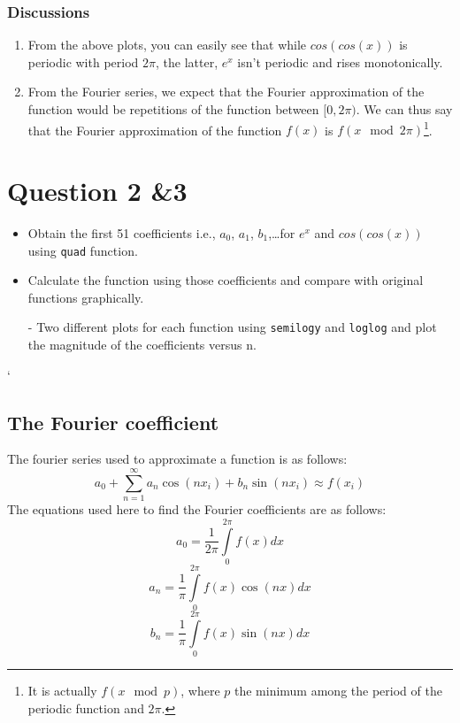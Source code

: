 \documentclass[11pt, a4paper, twoside]{article}
\begin{document}
            \subsubsection{Discussions}
                \begin{enumerate}
                    \item From the above plots, you can easily see that while $cos(cos(x))$ is periodic with period $2\pi$, the latter, $e^x$ isn't periodic and rises monotonically.
                    \item From the Fourier series, we expect that the Fourier approximation of the function would be repetitions of the function between $[0, 2\pi)$. We can thus say that the Fourier approximation of the function $f(x)$ is $f(x\mod2\pi)$\footnote{It is actually $f(x\mod p)$, where $p$ the minimum among the period of the periodic function and $2\pi$.}.
                \end{enumerate}
 
        \section{Question 2 \&3}
            \begin{itemize}[label=-]
                \item Obtain the first 51 coefficients i.e., $a_0$, $a_1$, $b_1$,\ldots for $e^x$ and $cos(cos(x))$ using \texttt{quad} function.
                \item Calculate the function using those coefficients and compare with original functions graphically.
                \item[-] Two  different  plots  for  each  function  using  \texttt{semilogy}  and  \texttt{loglog} and plot the magnitude of the coefficients versus n.
            \end{itemize}
 
`

\subsection{The Fourier coefficient}
The fourier series used to approximate a function is as follows:
\begin{equation}
    a_{0} + \sum\limits_{n=1}^{\infty} {{a_{n}\cos(nx_{i})+b_{n}\sin(nx_{i})}} \approx f(x_{i}) 
    \end{equation}
    	The equations used here to find the Fourier coefficients are as follows:
    \begin{equation}
         a_{0} = \frac{1}{2\pi}\int\limits_{0}^{2\pi} f(x)dx 
    \end{equation}
    \begin{equation}
         a_{n} = \frac{1}{\pi}\int\limits_{0}^{2\pi} f(x)\cos(nx)dx 
    \end{equation}
    \begin{equation}
         b_{n} = \frac{1}{\pi}\int\limits_{0}^{2\pi} f(x)\sin(nx)dx 
    \end{equation}
\end{document}
